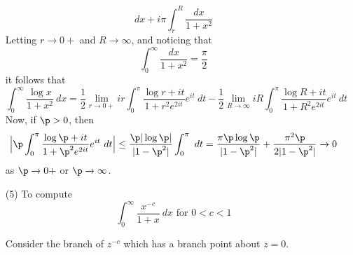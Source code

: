 \begin{example}
\begin{enumerate}
\begin{equation*}
{               dx}+i\pi\int_r^R{\frac{dx}{1+x^2}}
           \end{equation*}
           Letting $r \xrightarrow{} 0+$ and $R \xrightarrow{} \infty$, and
           noticing that
           \begin{equation*}
               \int_0^\infty{\frac{dx}{1+x^2}}=\frac{\pi}{2}
           \end{equation*}
           it follows that
           \begin{equation*}
               \int_0^\infty{\frac{\log{x}}{1+x^2} \ dx}=
               \frac{1}{2}\lim_{r \xrightarrow{} 0+}
                    {ir\int_0^\pi{\frac{\log{r}+it}{1+r^2e^{2it}}}e^{it} \ dt}-
                \frac{1}{2}\lim_{R \xrightarrow{} \infty}
                {iR\int_0^\pi{\frac{\log{R}+it}{1+R^2e^{2it}}}e^{it} \ dt}
           \end{equation*}
           Now, if $\p>0$, then
           \begin{equation*}
           \Big{|} \p\int_0^\pi{\frac{\log{\p}+it}{1+\p^2e^{2it}}e^{it} \ dt} \Big{|}
           \leq \frac{\p|\log{\p}|}{|1-\p^2|}\int_0^\pi{ \ dt}=
           \frac{\pi\p\log{\p}}{|1-\p^2|}+\frac{\pi^2\p}{2|1-\p^2|}
           \xrightarrow{} 0
           \end{equation*}
           as $\p \xrightarrow{} 0+$ or $\p \xrightarrow{} \infty$.

       \item[(5)] To compute
           \begin{equation*}
               \int_0^\infty{\frac{x^{-c}}{1+x} \ dx} \text{ for } 0<c<1
           \end{equation*}

           Consider the branch of $z^{-c}$ which has a branch point about $z=0$.


\end{enumerate}
\end{example}
